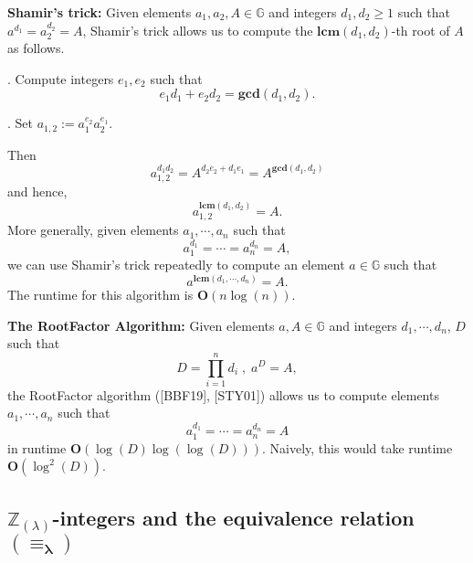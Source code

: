 \documentclass[11pt, lettersize, notitlepage, leqno, footskip=0.6cm]{article}
\newcommand{\bz}{\mathbb Z}
\newcommand{\pl}{\prod\limits}
\newcommand{\slim}{\sum\limits}
\newcommand{\mb}{\mathbb}
\newcommand{\mbf}{\mathbf}
\newcommand{\lam}{\lambda}
\newcommand{\lamb}{\lambda}
\newcommand{\vs}{\vspace{-0.15cm}}
\newcommand{\op}{overwhelming probability}
\newcommand{\LCM}{\mbf{lcm}}
\newcommand{\GCD}{\mbf{gcd}}
\numberwithin{equation}{section}
\begin{document}
\noindent \textbf{Shamir's trick:} Given elements $a_1, a_2, A\in \mb{G}$ and integers $d_1, d_2\geq 1$ such that $a^{d_1} = a_2^{d_2} = A$, Shamir's trick allows us to compute the $\LCM(d_1, d_2)$-th root of $A$ as follows.

. Compute integers $e_1, e_2$ such that \vs $$e_1d_1+e_2d_2 = \GCD(d_1, d_2).$$

. Set $a_{1,2}:= a_1^{e_2}a_2^{e_1} $. 

\noindent Then \vspace{-0.15cm}$$a_{1,2}^{d_1d_2} = A^{d_2e_2 + d_1e_1} = A^{\GCD(d_1,d_2)}$$ and hence, \vspace{-0.15cm}$$a_{1,2}^{\LCM(d_1,d_2)} = A.$$ More generally, given elements $a_1,\cdots,a_n$ such that \vs $$a_1^{d_1} = \cdots = a_n^{d_n} = A, $$ we can use Shamir's trick repeatedly to compute an element $a\in\mb{G}$ such that \vs $$a^{\LCM(d_1,\cdots,d_n)} = A.$$ The runtime for this algorithm is $\mbf{O}(n\log(n))$. 

\begin{comment} Conversely, for any element $b = \pl_{i=1}^n a_i^{x_i}$ $(x_i\in\bz)$, we have \vs $$ b^{\LCM(d_1,\cdots,d_n)} = A^{\slim_{i=1}^n  \frac{\LCM(d_1,\cdots,d_n)x_i}{d_i}} $$ and the low order assumption implies that with \op, \vs $$b =  a^{\slim_{i=1}^n  \frac{\LCM(d_1,\cdots,d_n)x_i}{d_i}}.$$ Thus, $b$ is expressible as a power of $a$. 

\end{comment}

\vspace{0.2cm}


\noindent \textbf{The RootFactor Algorithm:} Given elements $a, A\in\mb{G}$ and integers $d_1,\cdots, d_n$, $D$ such that \vs $$D= \pl_{i=1}^n d_i\; ,\; a^{D} = A,$$ the RootFactor algorithm ([BBF19], [STY01]) allows us to compute elements $a_1,\cdots, a_n$ such that \vs $$a_1^{d_1}=\cdots = a_n^{d_n} = A$$ in runtime $\mbf{O}(\log(D)\log(\log(D)))$. Naively, this would take runtime $\mbf{O}(\log^2(D))$.


\subsection{\fontsize{11}{11}\selectfont $\bz_{(\lamb)}$-integers and the equivalence relation $\mathbf{(\equiv_{\lam})}$}

\end{document}
